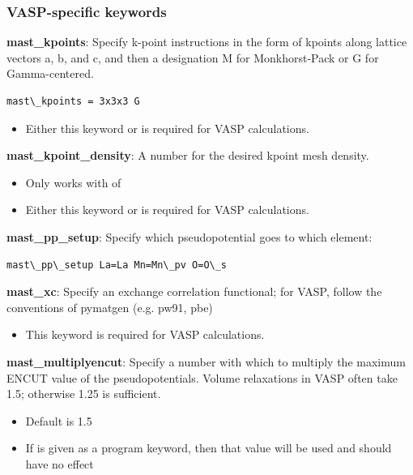\documentclass[letterpaper,10pt,english]{sphinxmanual}
\begin{document}
\subsubsection{VASP-specific keywords}
\label{3_1_2_ingredients:vasp-specific-keywords}
\textbf{mast\_kpoints}: Specify k-point instructions in the form of kpoints along lattice vectors a, b, and c, and then a designation M for Monkhorst-Pack or G for Gamma-centered.

\begin{Verbatim}[commandchars=\\\{\}]
mast\_kpoints = 3x3x3 G
\end{Verbatim}
\begin{itemize}
\item {} 
Either this keyword or  is required for VASP calculations.

\end{itemize}

\textbf{mast\_kpoint\_density}: A number for the desired kpoint mesh density.
\begin{itemize}
\item {} 
Only works with  of 

\item {} 
Either this keyword or  is required for VASP calculations.

\end{itemize}

\textbf{mast\_pp\_setup}: Specify which pseudopotential goes to which element:

\begin{Verbatim}[commandchars=\\\{\}]
mast\_pp\_setup La=La Mn=Mn\_pv O=O\_s
\end{Verbatim}

\textbf{mast\_xc}: Specify an exchange correlation functional; for VASP, follow the conventions of pymatgen (e.g. pw91, pbe)
\begin{itemize}
\item {} 
This keyword is required for VASP calculations.

\end{itemize}

\textbf{mast\_multiplyencut}: Specify a number with which to multiply the maximum ENCUT value of the pseudopotentials. Volume relaxations in VASP often take 1.5; otherwise 1.25 is sufficient.
\begin{itemize}
\item {} 
Default is 1.5

\item {} 
If  is given as a program keyword, then that value will be used and  should have no effect

\end{itemize}
\end{document}
